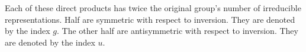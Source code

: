 Each of these direct products has twice the original group's number of irreducible representations.
Half are symmetric with respect to inversion.
They are denoted by the index $g$.
The other half are antisymmetric with respect to inversion.
They are denoted by the index $u$.
